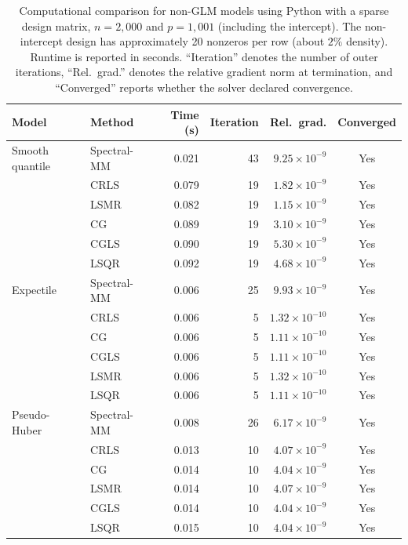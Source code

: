 \begin{table}[htbp]
\centering
\small
\setlength{\tabcolsep}{4pt}
\caption{
Computational comparison for non-GLM models using Python with a sparse design matrix,
$n=2{,}000$ and $p=1{,}001$ (including the intercept).
The non-intercept design has approximately 20 nonzeros per row (about $2\%$ density).
Runtime is reported in seconds. ``Iteration\textquotedblright{} denotes the number of outer iterations,
``Rel.\ grad.\textquotedblright{} denotes the relative gradient norm at termination, and
``Converged\textquotedblright{} reports whether the solver declared convergence.}
\label{tab:python-nonglm-comparison-sparse}
\begin{tabular}{llrrrc}
\toprule
Model & Method & Time (s) & Iteration & Rel.\ grad. & Converged \\
\midrule

Smooth quantile
& Spectral-MM & 0.021 & 43 & $9.25\times10^{-9}$ & Yes \\
& CRLS & 0.079 & 19 & $1.82\times10^{-9}$ & Yes \\
& LSMR & 0.082 & 19 & $1.15\times10^{-9}$ & Yes \\
& CG & 0.089 & 19 & $3.10\times10^{-9}$ & Yes \\
& CGLS & 0.090 & 19 & $5.30\times10^{-9}$ & Yes \\
& LSQR & 0.092 & 19 & $4.68\times10^{-9}$ & Yes \\
\midrule

Expectile
& Spectral-MM & 0.006 & 25 & $9.93\times10^{-9}$ & Yes \\
& CRLS & 0.006 & 5 & $1.32\times10^{-10}$ & Yes \\
& CG & 0.006 & 5 & $1.11\times10^{-10}$ & Yes \\
& CGLS & 0.006 & 5 & $1.11\times10^{-10}$ & Yes \\
& LSMR & 0.006 & 5 & $1.32\times10^{-10}$ & Yes \\
& LSQR & 0.006 & 5 & $1.11\times10^{-10}$ & Yes \\
\midrule

Pseudo-Huber
& Spectral-MM & 0.008 & 26 & $6.17\times10^{-9}$ & Yes \\
& CRLS & 0.013 & 10 & $4.07\times10^{-9}$ & Yes \\
& CG & 0.014 & 10 & $4.04\times10^{-9}$ & Yes \\
& LSMR & 0.014 & 10 & $4.07\times10^{-9}$ & Yes \\
& CGLS & 0.014 & 10 & $4.04\times10^{-9}$ & Yes \\
& LSQR & 0.015 & 10 & $4.04\times10^{-9}$ & Yes \\
\midrule


\end{tabular}
\end{table}
